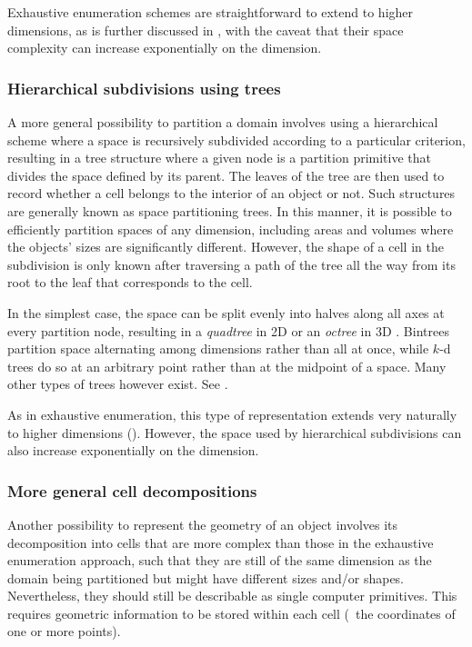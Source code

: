 Exhaustive enumeration schemes are straightforward to extend to higher dimensions, as is further discussed in , with the caveat that their space complexity can increase exponentially on the dimension.

\subsubsection{Hierarchical subdivisions using trees}

A more general possibility to partition a domain involves using a hierarchical scheme where a space is recursively subdivided according to a particular criterion, resulting in a tree structure where a given node is a partition primitive that divides the space defined by its parent.
The leaves of the tree are then used to record whether a cell belongs to the interior of an object or not.
Such structures are generally known as space partitioning trees.
In this manner, it is possible to efficiently partition spaces of any dimension, including areas and volumes where the objects' sizes are significantly different.
However, the shape of a cell in the subdivision is only known after traversing a path of the tree all the way from its root to the leaf that corresponds to the cell.

In the simplest case, the space can be split evenly into halves along all axes at every partition node, resulting in a \emph{quadtree} in 2D \citep{Finkel74} or an \emph{octree} in 3D \citep{Meagher80}.
Bintrees \citep{Samet85} partition space alternating among dimensions rather than all at once, while $k$-d trees \citep{Bentley75} do so at an arbitrary point rather than at the midpoint of a space.
Many other types of trees however exist.
See \citep{Manolopoulos06}.

As in exhaustive enumeration, this type of representation extends very naturally to higher dimensions ().
However, the space used by hierarchical subdivisions can also increase exponentially on the dimension.

\subsubsection{More general cell decompositions}

Another possibility to represent the geometry of an object involves its decomposition into cells that are more complex than those in the exhaustive enumeration approach, such that they are still of the same dimension as the domain being partitioned but might have different sizes and/or shapes.
Nevertheless, they should still be describable as single computer primitives.
This requires geometric information to be stored within each cell (\eg\ the coordinates of one or more points).

